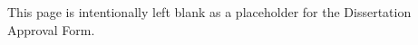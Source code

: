 \begin{center}
\vspace*{\fill}
This page is intentionally left blank as a placeholder for the Dissertation Approval Form.
\vspace*{\fill}
\end{center}
\clearpage
